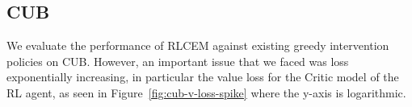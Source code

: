 
\subsection{CUB}

We evaluate the performance of RLCEM against existing 
greedy intervention policies on CUB. However, an important issue that 
we faced was loss exponentially increasing, 
in particular the value loss for the Critic model of the
RL agent, as seen in Figure~\ref{fig:cub-v-loss-spike} where the y-axis is 
logarithmic.



